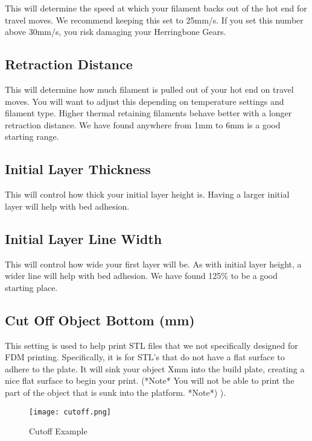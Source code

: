 This will determine the speed at which your filament backs out of the hot end for travel moves. We recommend keeping this set to 25mm/s. If you set this number above 30mm/s, you risk damaging your Herringbone Gears.

\subsection{Retraction Distance}

This will determine how much filament is pulled out of your hot end on travel moves. You will want to adjust this depending on temperature settings and filament type. Higher thermal retaining filaments behave better with a longer retraction distance. We have found anywhere from 1mm to 6mm is a good starting range.

\subsection{Initial Layer Thickness}

This will control how thick your initial layer height is. Having a larger initial layer will help with bed adhesion.

\subsection{Initial Layer Line Width}

This will control how wide your first layer will be. As with initial layer height, a wider line will help with bed adhesion. We have found 125\% to be a good starting place.

\subsection{Cut Off Object Bottom (mm)}

This setting is used to help print STL files that we not specifically designed for FDM printing. Specifically, it is for STL's that do not have a flat surface to adhere to the plate. It will sink your object Xmm into the build plate, creating a nice flat surface to begin your print. (*Note* You will not be able to print the part of the object that is sunk into the platform. *Note*)
\pageref{fig:Cutoff Setting}).
\begin{figure}[hbt]
\centering
\texttt{[image: cutoff.png]}
\caption{Cutoff Example}
\label{fig:Cutoff Example}
\end{figure}

